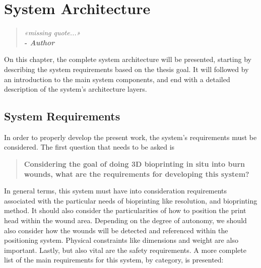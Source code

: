 \chapter{System Architecture}
\label{cha:system_architecture}

\begin{quotation}
\begin{flushright}
\itshape
«missing quote...»\\
\textbf{- Author}
\end{flushright}
\end{quotation}

On this chapter, the complete system architecture will be presented, starting by describing the system requirements based on the thesis goal. It will followed by an introduction to the main system components, and end with a detailed description of the system's architecture layers.


\section{System Requirements}
\label{sec:system_architecture_requirements}

In order to properly develop the present work, the system's requirements must be considered. The first question that needs to be asked is

\begin{quotation}
\textbf{Considering the goal of doing 3D bioprinting in situ into burn wounds, what are the requirements for developing this system?}
\end{quotation}

In general terms, this system must have into consideration requirements associated with the particular needs of bioprinting like resolution, and bioprinting method. It should also consider the particularities of how to position the print head within the wound area. Depending on the degree of autonomy, we should also consider how the wounds will be detected and referenced within the positioning system. Physical constraints like dimensions and weight are also important. Lastly, but also vital are the safety requirements. A more complete list of the main requirements for this system, by category, is presented:

